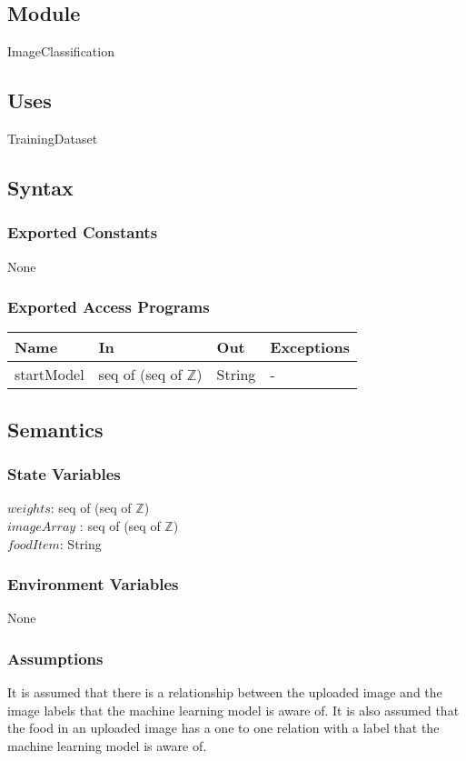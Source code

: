 \documentclass[12pt, titlepage]{article}
\begin{document}
\subsection{Module}
ImageClassification
\subsection{Uses}
TrainingDataset
\subsection{Syntax}
\subsubsection{Exported Constants}
None
\subsubsection{Exported Access Programs}
\begin{center}
\begin{tabular}{p{2cm} p{4cm} p{4cm} p{2cm}}
\hline
\textbf{Name} & \textbf{In} & \textbf{Out} & \textbf{Exceptions} \\
\hline
startModel & seq of (seq of $\mathbb{Z}$) & String & - \\
\hline
\end{tabular}
\end{center}
\subsection{Semantics}
\subsubsection{State Variables}
$weights$: seq of (seq of $\mathbb{Z}$)\\
$imageArray$ : seq of (seq of $\mathbb{Z}$)\\
$foodItem$: String
\subsubsection{Environment Variables}
None
\subsubsection{Assumptions}
It is assumed that there is a relationship between the uploaded image and the image labels that the machine learning model is aware of. It is also  assumed that the food in an uploaded image has a one to one relation with a label that the machine learning model is aware of.
\end{document}
